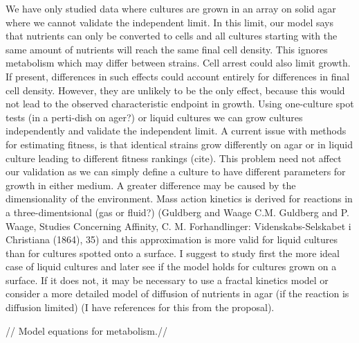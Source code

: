 We have only studied data where cultures are grown in an array on
solid agar where we cannot validate the independent limit. In this
limit, our model says that nutrients can only be converted to cells
and all cultures starting with the same amount of nutrients will reach
the same final cell density. This ignores metabolism which may differ
between strains. Cell arrest could also limit growth. If present,
differences in such effects could account entirely for differences in
final cell density. However, they are unlikely to be the only effect,
because this would not lead to the observed characteristic endpoint in
growth. Using one-culture spot tests (in a perti-dish on ager?) or
liquid cultures we can grow cultures independently and validate the
independent limit. A current issue with methods for estimating
fitness, is that identical strains grow differently on agar or in
liquid culture leading to different fitness rankings (cite). This
problem need not affect our validation as we can simply define a
culture to have different parameters for growth in either medium. A
greater difference may be caused by the dimensionality of the
environment. Mass action kinetics is derived for reactions in a
three-dimentsional (gas or fluid?) (Guldberg and Waage C.M. Guldberg
and P. Waage, Studies Concerning Affinity, C. M. Forhandlinger:
Videnskabs-Selskabet i Christiana (1864), 35) and this approximation
is more valid for liquid cultures than for cultures spotted onto a
surface. I suggest to study first the more ideal case of liquid cultures
and later see if the model holds for cultures grown on a surface. If
it does not, it may be necessary to use a fractal kinetics model or
consider a more detailed model of diffusion of nutrients in agar (if
the reaction is diffusion limited) (I have references for this from
the proposal).

// Model equations for metabolism.//

